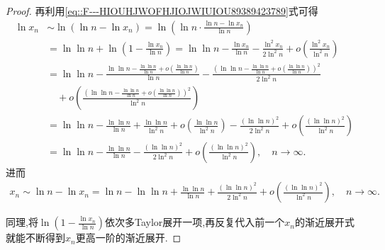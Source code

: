 \documentclass[../../main.tex]{subfiles}%
\begin{document}
\begin{proof}
再利用\eqref{eq::F---HIOUHJWOFHJIOJWIUIOU89389423789}式可得
\begin{align*}
\ln x_n&\sim \ln \left( \ln n-\ln x_n \right) =\ln \left( \ln n\cdot \frac{\ln n-\ln x_n}{\ln n} \right)\\
&=\ln\ln n+\ln \left( 1-\frac{\ln x_n}{\ln n} \right) =\ln\ln n-\frac{\ln x_n}{\ln n}-\frac{\ln ^2x_n}{2\ln ^2n}+o\left( \frac{\ln ^2x_n}{\ln ^2n} \right)\\
&=\ln\ln n-\frac{\ln\ln n-\frac{\ln\ln n}{\ln n}+o\left( \frac{\ln\ln n}{\ln n} \right)}{\ln n}-\frac{\left( \ln\ln n-\frac{\ln\ln n}{\ln n}+o\left( \frac{\ln\ln n}{\ln n} \right) \right) ^2}{2\ln ^2n}\\
&\quad +o\left( \frac{\left( \ln\ln n-\frac{\ln\ln n}{\ln n}+o\left( \frac{\ln\ln n}{\ln n} \right) \right) ^2}{\ln ^2n} \right)\\
&=\ln\ln n-\frac{\ln\ln n}{\ln n}+\frac{\ln\ln n}{\ln ^2n}+o\left( \frac{\ln\ln n}{\ln ^2n} \right) -\frac{\left( \ln\ln n \right) ^2}{2\ln ^2n}+o\left( \frac{\left( \ln\ln n \right) ^2}{\ln ^2n} \right)\\
&=\ln\ln n-\frac{\ln\ln n}{\ln n}-\frac{\left( \ln\ln n \right) ^2}{2\ln ^2n}+o\left( \frac{\left( \ln\ln n \right) ^2}{\ln ^2n} \right) ,\quad n\rightarrow \infty .
\end{align*}
进而
\begin{align*}
x_n\sim \ln n-\ln x_n=\ln n-\ln\ln n+\frac{\ln\ln n}{\ln n}+\frac{\left( \ln\ln n \right) ^2}{2\ln ^2n}+o\left( \frac{\left( \ln\ln n \right) ^2}{\ln ^2n} \right) ,\quad n\rightarrow \infty .
\end{align*}

同理,将$\ln \left( 1-\frac{\ln x_n}{\ln n} \right)$依次多Taylor展开一项,再反复代入前一个$x_n$的渐近展开式就能不断得到$x_n$更高一阶的渐近展开.
\end{proof}
\end{document}

